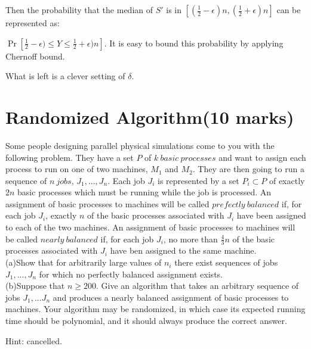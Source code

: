 \documentclass[a4paper,11pt]{article}
\begin{document}
Then the probability that the median of $S'$ is in $[(\frac{1}{2}-\epsilon)n, (\frac{1}{2}+\epsilon)n]$ can be represented as: 

$\Pr[ \frac{1}{2}-\epsilon) \leq Y \leq \frac{1}{2}+\epsilon)n]$. It is easy to bound this probability by applying Chernoff bound. 

What is left is a clever setting of  $\delta$. 


\section{Randomized Algorithm(10 marks)}

Some people designing parallel physical simulations come to you with the following problem. They have a set $P$ of $k\ basic\ processes$ and want to assign each process to run on one of two machines, $M_1$ and $M_2$. They are then going to run a sequence of $n\ jobs$, $J_1,...,J_n$. Each job $J_i$ is represented by a set $P_i\subset P$ of exactly $2n$ basic processes which must be running while the job is processed. An assignment of basic processes to machines will be called $prefectly\ balanced$ if, for each job $J_i$, exactly $n$ of the basic processes associated with $J_i$ have been assigned to each of the two machines. An assignment of basic processes to machines will be called $nearly\ balanced$ if, for each job $J_i$, no more than $\frac{4}{3}n$ of the basic processes associated with $J_i$ have ben assigned to the same machine.\\

	 (a)Show that for arbitrarily large values of $n_i$ there exist sequences of jobs $J_1,...,J_n$ for which no perfectly balanced assignment exists.\\

	 (b)Suppose that $n\geq 200$. Give an algorithm that takes an arbitrary sequence of jobs $J_1,...J_n$ and produces a nearly balanced assignment of basic processes to machines. Your algorithm may be randomized, in which case its expected running time should be polynomial, and it should always produce the correct answer.

Hint: cancelled. 
\end{document}
